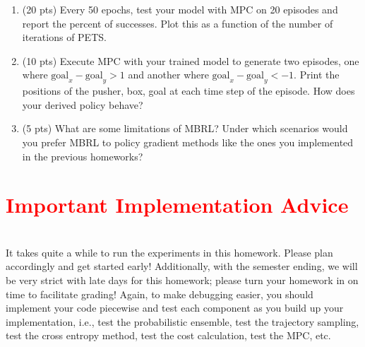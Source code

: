\documentclass[12pt]{article}
\begin{document}
\begin{enumerate}
\begin{enumerate}
    \begin{solution}
    \end{solution}
    \item (20 pts) Every 50 epochs, test your model with MPC on 20 episodes and report the percent of successes.  Plot this as a function of the number of iterations of PETS.
    \begin{solution}
    \end{solution}
    \item (10 pts) Execute MPC with your trained model to generate two episodes, one where $\text{goal}_x - \text{goal}_y > 1$ and another where $\text{goal}_x - \text{goal}_y < -1$.  Print the positions of the pusher, box, goal at each time step of the episode.  How does your derived policy behave?
    \begin{solution}
    \end{solution}
    \item (5 pts) What are some limitations of MBRL?  Under which scenarios would you prefer MBRL to policy gradient methods like the ones you implemented in the previous homeworks?
\end{enumerate}
 
\end{enumerate}

\section*{\textcolor{red}{Important Implementation Advice}}
\ \\
It takes quite a while to run the experiments in this homework.  Please plan accordingly and get started early!  Additionally, with the semester ending, we will be very strict with late days for this homework; please turn your homework in on time to facilitate grading!  Again, to make debugging easier, you should implement your code piecewise and test each component as you build up your implementation, i.e., test the probabilistic ensemble, test the trajectory sampling, test the cross entropy method, test the cost calculation, test the MPC, etc.


\end{document}
